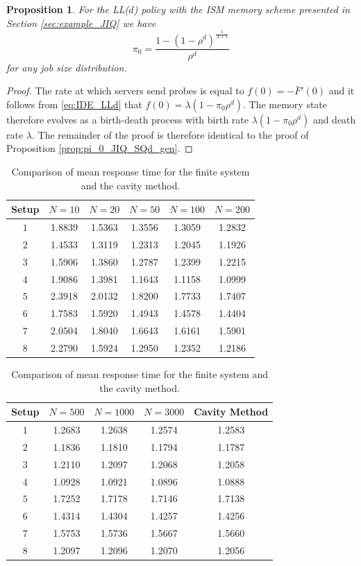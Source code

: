 \documentclass[12pt]{report}
\newtheorem{proposition}[theorem]{Proposition}
\begin{document}
\begin{proposition}\label{prop:pi_0_JIQ_LLd}
For the LL($d$) policy with the ISM memory scheme presented in Section \ref{sec:example_JIQ} we have $$\pi_0=\frac{1-(1-\rho^d)^{\frac{1}{A+1}}}{\rho^d}$$ for any job size distribution.
\end{proposition}
\begin{proof}
The rate at which servers send probes is equal to $f(0)=-\bar F'(0)$ and it follows from \eqref{eq:IDE_LLd} that $f(0) = \lambda(1-\pi_0 \rho^d)$. The memory state therefore evolves as a birth-death process
with birth rate $\lambda(1-\pi_0 \rho^d)$ and death rate $\lambda$. The remainder of the proof
is therefore identical to the proof of Proposition \ref{prop:pi_0_JIQ_SQd_gen}.
\end{proof}

\begin{center}
\begin{table}[]
\begin{tabular}{c|ccccc}
      Setup  & $N=10$ & $N=20$ & $N=50$ & $N=100$ & $N=200$ \\ \hline
 $1$ & 1.8839 & 1.5363 & 1.3556 & 1.3059  & 1.2832       \\
 $2$ & 1.4533 & 1.3119 & 1.2313 & 1.2045  & 1.1926       \\
 $3$ & 1.5906 & 1.3860 & 1.2787 & 1.2399  & 1.2215       \\
 $4$ & 1.9086 & 1.3981 & 1.1643 & 1.1158  & 1.0999       \\
 $5$ & 2.3918 & 2.0132 & 1.8200 & 1.7733  & 1.7407       \\
 $6$ & 1.7583 & 1.5920 & 1.4943 & 1.4578  & 1.4404       \\
$7$ & 2.0504 & 1.8040 & 1.6643 & 1.6161  & 1.5901       \\
 $8$ & 2.2790 & 1.5924 & 1.2950 & 1.2352  & 1.2186 
\end{tabular}
\begin{tabular}{c|cccc}
      Setup  & $N=500$ & $N=1000$ & $N=3000$ & Cavity Method \\ \hline
 $1$  & 1.2683  & 1.2638   & 1.2574   & 1.2583       \\
 $2$  & 1.1836  & 1.1810   & 1.1794   & 1.1787       \\
 $3$  & 1.2110  & 1.2097   & 1.2068   & 1.2058       \\
 $4$  & 1.0928  & 1.0921   & 1.0896   & 1.0888       \\
 $5$  & 1.7252  & 1.7178   & 1.7146   & 1.7138       \\
 $6$  & 1.4314  & 1.4304   & 1.4257   & 1.4256       \\
 $7$  & 1.5753  & 1.5736   & 1.5667   & 1.5660       \\
 $8$  & 1.2097  & 1.2096   & 1.2070   & 1.2056 
\end{tabular}
\caption{Comparison of mean response time for the finite system and the cavity method.} \label{table:fin_acc}
\end{table}
\end{center}
\end{document}
